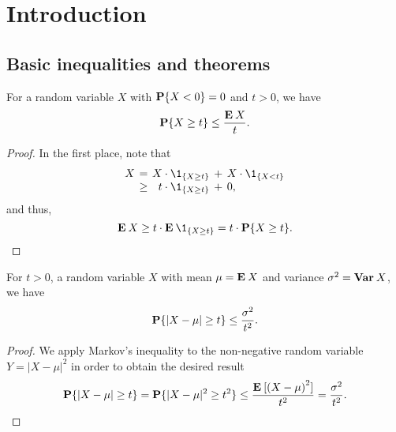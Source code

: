 \chapter{Introduction}

\section{Basic inequalities and theorems}


\begin{theorem}\label{markov}
  For a random variable $X$ with $\P\{X < 0\} = 0$ and $t>0$, we have
  \[ \P\{X \geq t\} \leq \frac{\E X}{t}.\]
\end{theorem}

\vspace*{1em}

\begin{proof}
 In the first place, note that
 \[\arraycolsep=2pt
  \begin{array}{rrrll}
  X & = & X\cdot \1_{\{X \geq t\}} & + & X \cdot \1_{\{X < t\}}\\
    & \geq &t \cdot \1_{\{X \geq t\}} & + & 0,
 \end{array}\]
and thus,
\[ \E X \geq t \cdot \E \1_{\{X \geq t\}} = t \cdot \P\{X \geq t\}. \]
\end{proof}

\vspace*{2em}

\begin{theorem}\label{chebyshev}
  For $t > 0$, a random variable $X$ with mean $\mu = \E X$ and variance $\sigma^2 = \Var X$, we have
  \[ \P\{|X-\mu| \geq t\} \leq \frac{\sigma^2}{t^2}. \] 
\end{theorem}

\begin{proof}
  We apply Markov's inequality to the non-negative random variable $Y = |X-\mu|^2$ in order to obtain the desired result
  \[ \P\{|X-\mu| \geq t \} = \P\{|X-\mu|^2 \geq t^2 \} \leq \frac{\E [{(X-\mu)}^2]}{t^2} = \frac{\sigma^2}{t^2}.\] 
\end{proof}



